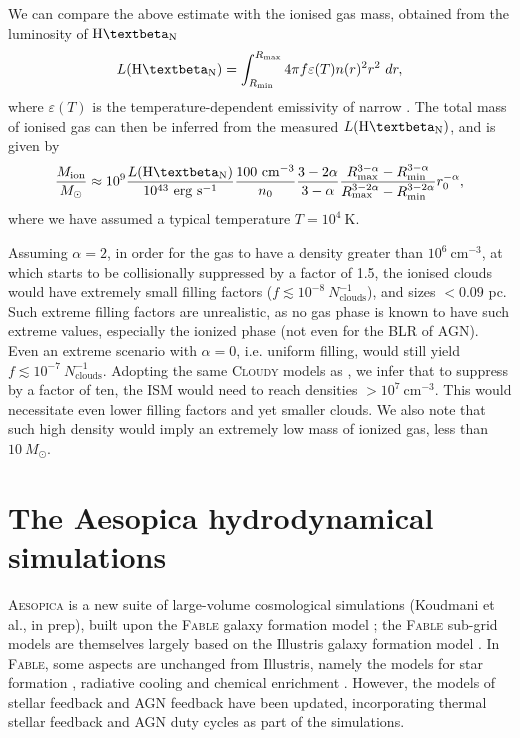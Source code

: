\documentclass[fleqn,usenatbib]{mnras}
\newcommand{\Hbeta}{\text{H\textbeta}\xspace}
\begin{document}
We can compare the above estimate with the ionised gas mass, obtained from the luminosity of $\Hbeta_\mathrm{N}$
\begin{equation}
    L(\Hbeta_\mathrm{N}) = \int_{R_\mathrm{min}}^{R_\mathrm{max}}4\pi f\varepsilon(T)n(r)^2r^2 \ dr,
\end{equation}
where $\varepsilon(T)$ is the temperature-dependent emissivity of narrow \Hbeta. The total mass of ionised gas can then be inferred from the measured $L(\Hbeta_\mathrm{N})$, and is given by
\begin{equation}
    \frac{M_\mathrm{ion}}{M_\odot} \approx 10^9 \frac{L(\Hbeta_\mathrm{N})}{10^{43} \ \mathrm{erg} \ \mathrm{s}^{-1}} \frac{100 \ \mathrm{cm}^{-3}}{n_0} \frac{3-2\alpha}{3-\alpha} \frac{R^{3-\alpha}_\mathrm{max}-R^{3-\alpha}_\mathrm{min}}{R^{3-2\alpha}_\mathrm{max}-R^{3-2\alpha}_\mathrm{min}} r_0^{-\alpha}, 
    \label{eq:iongasmass}
\end{equation}
where we have assumed a typical temperature $T = 10^4 \ \mathrm{K}$.

Assuming $\alpha=2$, in order for the gas to have a density greater than $10^6~\mathrm{cm}^{-3}$, at which \OIIIL starts to be collisionally suppressed by a factor of 1.5, the ionised clouds would have extremely small filling factors ($f \lesssim 10^{-8} \ N_\mathrm{clouds}^{-1}$), and sizes $<0.09$ pc.
Such extreme filling factors are unrealistic, as no gas phase is known to have such extreme values, especially the ionized phase (not even for the BLR of AGN). Even an extreme scenario with $\alpha=0$, i.e. uniform filling, would still yield $f \lesssim 10^{-7}\ N_\mathrm{clouds}^{-1}$. Adopting the same \textsc{Cloudy} models as \cite{Maiolino2025_QSO1}, we infer that to suppress \OIIIL by a factor of ten, the ISM would need to reach densities $>10^7 \ \mathrm{cm}^{-3}$. This would necessitate even lower filling factors and yet smaller clouds.
We also note that such high density would imply an extremely low mass of ionized gas, less than $10~M_\odot$.

\section{The Aesopica hydrodynamical simulations}\label{sec:sims}

\textsc{Aesopica} is a new suite of large-volume cosmological simulations (Koudmani et al., in prep), built upon the \textsc{Fable} galaxy formation model \citep{Henden2018}; the \textsc{Fable} sub-grid models are themselves largely based on the Illustris galaxy formation model \citep{Vogelsberger2014}. In \textsc{Fable}, some aspects are unchanged from Illustris, namely the models for star formation \citep{SpringelHernquist2003}, radiative cooling \citep{Katz1996, Wiersma2009a} and chemical enrichment \citep{Wiersma2009b}. However, the models of stellar feedback \citep{Volgerssberger2013} and AGN feedback \citep{Sijacki2015} have been updated, incorporating thermal stellar feedback and AGN duty cycles as part of the simulations.
\end{document}
